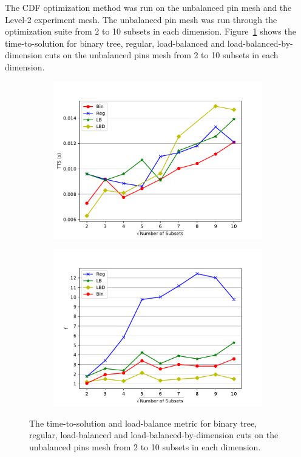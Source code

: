 \documentclass[times,final]{elsarticle}
\begin{document}
The CDF optimization method was run on the unbalanced pin mesh and the Level-2 experiment mesh.
The unbalanced pin mesh was run through the optimization suite from 2 to 10 subsets in each dimension.
Figure~\ref{ubp_opt} shows the time-to-solution for binary tree, regular, load-balanced and load-balanced-by-dimension cuts on the unbalanced pins mesh from 2 to 10 subsets in each dimension.
\begin{figure}[h]
\centering
  \begin{subfigure}[t]{0.49\textwidth}
    \centering
  \includegraphics[scale=0.55]{../figures/unbalanced_pins_best_comparison.pdf}
  \end{subfigure}
    \begin{subfigure}[t]{0.49\textwidth}
    \centering
    \includegraphics[scale=0.55]{../figures/spiderweb_metric_study.pdf}
  \end{subfigure}  
  \caption{The time-to-solution and load-balance metric for binary tree, regular, load-balanced and load-balanced-by-dimension cuts on the unbalanced pins mesh from 2 to 10 subsets in each dimension.}
  \label{ubp_opt}
\end{figure}
\end{document}
